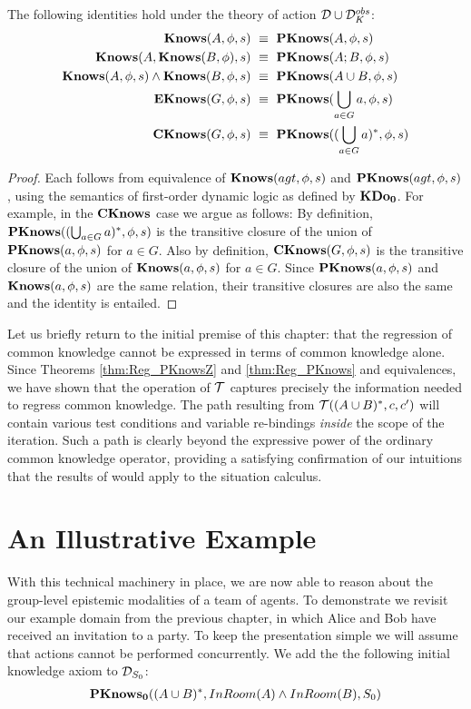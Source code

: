 \begin{thm}
The following identities hold under the theory of action $\mathcal{D}\cup\mathcal{D}_{K}^{obs}$:\begin{align*}
\mathbf{Knows}(A,\phi,s) & \,\,\equiv\,\,\mathbf{PKnows}(A,\phi,s)\\
\mathbf{Knows}(A,\mathbf{Knows}(B,\phi),s) & \,\,\equiv\,\,\mathbf{PKnows}(A;B,\phi,s)\\
\mathbf{Knows}(A,\phi,s)\wedge\mathbf{Knows}(B,\phi,s) & \,\,\equiv\,\,\mathbf{PKnows}(A\cup B,\phi,s)\\
\mathbf{EKnows}(G,\phi,s) & \,\,\equiv\,\,\mathbf{PKnows}(\bigcup_{a\in G}a,\phi,s)\\
\mathbf{CKnows}(G,\phi,s) & \,\,\equiv\,\,\mathbf{PKnows}((\bigcup_{a\in G}a)^{*},\phi,s)\end{align*}

\end{thm}
\begin{proof}
Each follows from equivalence of $\mathbf{Knows}(agt,\phi,s)$ and $\mathbf{PKnows}(agt,\phi,s)$,
using the semantics of first-order dynamic logic as defined by $\mathbf{KDo_{0}}$.
For example, in the $\mathbf{CKnows}$ case we argue as follows: By definition,
$\mathbf{PKnows}((\bigcup_{a\in G}a)^{*},\phi,s)$ is the transitive closure
of the union of $\mathbf{PKnows}(a,\phi,s)$ for $a\in G$. Also by definition,
$\mathbf{CKnows}(G,\phi,s)$ is the transitive closure of the union of $\mathbf{Knows}(a,\phi,s)$
for $a\in G$. Since $\mathbf{PKnows}(a,\phi,s)$ and $\mathbf{Knows}(a,\phi,s)$
are the same relation, their transitive closures are also the same
and the identity is entailed. 
\end{proof}
Let us briefly return to the initial premise of this chapter: that
the regression of common knowledge cannot be expressed in terms of
common knowledge alone. Since Theorems \ref{thm:Reg_PKnowsZ} and
\ref{thm:Reg_PKnows} and equivalences, we have shown that the operation
of $\mathcal{T}$ captures precisely the information needed to regress common
knowledge. The path resulting from $\mathcal{T}((A\cup B)^{*},c,c')$ will
contain various test conditions and variable re-bindings \emph{inside}
the scope of the iteration. Such a path is clearly beyond the expressive
power of the ordinary common knowledge operator, providing a satisfying
confirmation of our intuitions that the results of \citet{baltag98pa_ck}
would apply to the situation calculus.


\section{An Illustrative Example\label{sec:CKnowledge:Example}}

With this technical machinery in place, we are now able to reason
about the group-level epistemic modalities of a team of agents. To
demonstrate we revisit our example domain from the previous chapter,
in which Alice and Bob have received an invitation to a party. To
keep the presentation simple we will assume that actions cannot be
performed concurrently. We add the the following initial knowledge
axiom to $\mathcal{D}_{S_{0}}$:\begin{gather*}
\mathbf{PKnows_{0}}((A\cup B)^{*},InRoom(A)\wedge InRoom(B),S_{0})\end{gather*}


